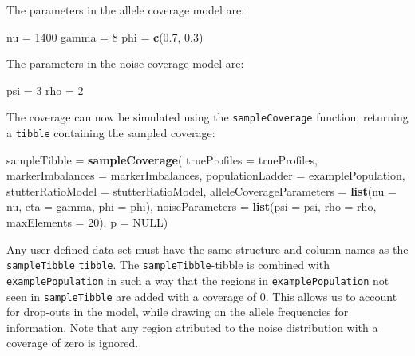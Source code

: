 \documentclass[]{article}
\newenvironment{Shaded}{\begin{snugshade}}{\end{snugshade}}
\newcommand{\KeywordTok}[1]{\textcolor[rgb]{0.13,0.29,0.53}{\textbf{#1}}}
\newcommand{\DataTypeTok}[1]{\textcolor[rgb]{0.13,0.29,0.53}{#1}}
\newcommand{\DecValTok}[1]{\textcolor[rgb]{0.00,0.00,0.81}{#1}}
\newcommand{\FloatTok}[1]{\textcolor[rgb]{0.00,0.00,0.81}{#1}}
\newcommand{\StringTok}[1]{\textcolor[rgb]{0.31,0.60,0.02}{#1}}
\newcommand{\OtherTok}[1]{\textcolor[rgb]{0.56,0.35,0.01}{#1}}
\newcommand{\NormalTok}[1]{#1}
\begin{document}
The parameters in the allele coverage model are:

\begin{Shaded}
\begin{Highlighting}[]
\NormalTok{nu =}\StringTok{ }\DecValTok{1400}
\NormalTok{gamma =}\StringTok{ }\DecValTok{8}
\NormalTok{phi =}\StringTok{ }\KeywordTok{c}\NormalTok{(}\FloatTok{0.7}\NormalTok{, }\FloatTok{0.3}\NormalTok{)}
\end{Highlighting}
\end{Shaded}

The parameters in the noise coverage model are:

\begin{Shaded}
\begin{Highlighting}[]
\NormalTok{psi =}\StringTok{ }\DecValTok{3}
\NormalTok{rho =}\StringTok{ }\DecValTok{2}
\end{Highlighting}
\end{Shaded}

The coverage can now be simulated using the \texttt{sampleCoverage}
function, returning a \texttt{tibble} containing the sampled coverage:

\begin{Shaded}
\begin{Highlighting}[]
\NormalTok{sampleTibble =}\StringTok{ }\KeywordTok{sampleCoverage}\NormalTok{(}
    \DataTypeTok{trueProfiles =}\NormalTok{ trueProfiles, }\DataTypeTok{markerImbalances =}\NormalTok{ markerImbalances,}
    \DataTypeTok{populationLadder =}\NormalTok{ examplePopulation, }\DataTypeTok{stutterRatioModel =}\NormalTok{ stutterRatioModel,}
    \DataTypeTok{alleleCoverageParameters =} \KeywordTok{list}\NormalTok{(}\DataTypeTok{nu =}\NormalTok{ nu, }\DataTypeTok{eta =}\NormalTok{ gamma, }\DataTypeTok{phi =}\NormalTok{ phi),}
    \DataTypeTok{noiseParameters =} \KeywordTok{list}\NormalTok{(}\DataTypeTok{psi =}\NormalTok{ psi, }\DataTypeTok{rho =}\NormalTok{ rho, }\DataTypeTok{maxElements =} \DecValTok{20}\NormalTok{), }
    \DataTypeTok{p =} \OtherTok{NULL}\NormalTok{)}
\end{Highlighting}
\end{Shaded}

Any user defined data-set must have the same structure and column names
as the \texttt{sampleTibble} \texttt{tibble}. The
\texttt{sampleTibble}-tibble is combined with \texttt{examplePopulation}
in such a way that the regions in \texttt{examplePopulation} not seen in
\texttt{sampleTibble} are added with a coverage of 0. This allows us to
account for drop-outs in the model, while drawing on the allele
frequencies for information. Note that any region atributed to the noise
distribution with a coverage of zero is ignored.
\end{document}
